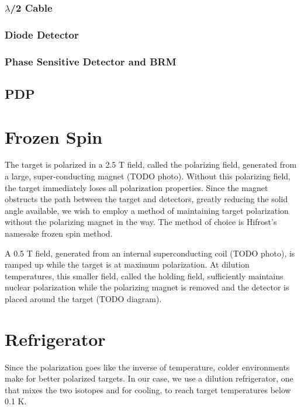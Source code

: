 \subsubsection{$\lambda$/2 Cable}

\subsubsection{Diode Detector}

\subsubsection{Phase Sensitive Detector and BRM}

\subsection{PDP}

\section{Frozen Spin} 
 
 The target is polarized in a 2.5 T field, called the polarizing field, generated from a large, super-conducting magnet (TODO photo).  Without this polarizing field, the target immediately loses all polarization properties.  Since the magnet obstructs the path between the target and detectors, greatly reducing the solid angle available, we wish to employ a method of maintaining target polarization without the polarizing magnet in the way.  The method of choice is Hifrost's namesake frozen spin method.
 
 
 A 0.5 T field, generated from an internal superconducting coil (TODO photo), is ramped up while the target is at maximum polarization.  At dilution temperatures, this smaller field, called the holding field, sufficiently maintains nuclear polarization while the polarizing magnet is removed and the detector is placed around the target (TODO diagram). 
 
 

\section{Refrigerator} 
Since the polarization goes like the inverse of temperature, colder environments make for better polarized targets.  In our case, we use a dilution refrigerator, one that mixes the two isotopes \het{} and \hef{} for cooling, to reach target temperatures below 0.1 K.

